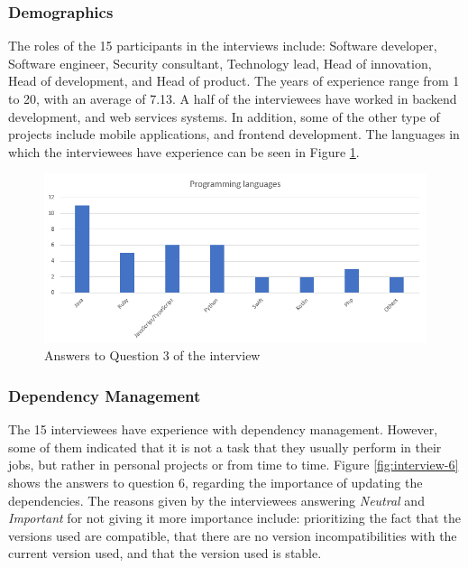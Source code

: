 \subsubsection{Demographics}

The roles of the 15 participants in the interviews include: Software developer, Software engineer, Security consultant, Technology lead, Head of innovation, Head of development, and Head of product. The years of experience range from 1 to 20, with an average of 7.13. A half of the interviewees have worked in backend development, and web services systems. In addition, some of the other type of projects include mobile applications, and frontend development. The languages in which the interviewees have experience can be seen in Figure \ref{fig:interview-3}.

\begin{figure}[ht]
\begin{center}
\includegraphics[width=\textwidth]{figures/interview/Question3.png}
\caption{Answers to Question 3 of the interview}
\label{fig:interview-3}
\end{center}
\end{figure}

\subsubsection{Dependency Management}

The 15 interviewees have experience with dependency management. However, some of them indicated that it is not a task that they usually perform in their jobs, but rather in personal projects or from time to time. Figure \ref{fig:interview-6} shows the answers to question 6, regarding the importance of updating the dependencies. The reasons given by the interviewees answering \textit{Neutral} and \textit{Important} for not giving it more importance include: prioritizing the fact that the versions used are compatible, that there are no version incompatibilities with the current version used, and that the version used is stable.

